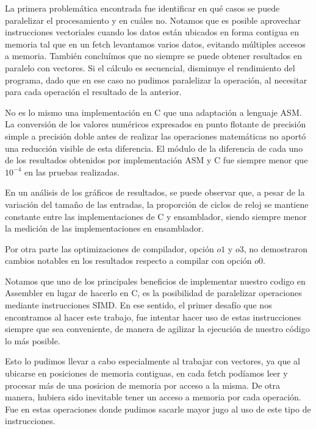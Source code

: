
\par La primera problemática encontrada fue identificar en qué casos se puede paralelizar el procesamiento y en cuáles no. Notamos que es posible aprovechar instrucciones vectoriales cuando los datos están ubicados en forma contigua en memoria tal que en un fetch levantamos varios datos, evitando múltiples accesos a memoria. También concluímos que no siempre se puede obtener resultados en paralelo con vectores. Si el cálculo es secuencial, disminuye el rendimiento del programa, dado que en ese caso no pudimos paralelizar la operación, al necesitar para cada operación el resultado de la anterior.

No es lo mismo una implementación en C que una adaptación a lenguaje ASM. La conversión de los valores numéricos expresados en punto flotante de precisión simple a precisión doble antes de realizar las operaciones matemáticas no aportó una reducción visible de esta diferencia. El módulo de la diferencia de cada uno de los resultados obtenidos por implementación ASM y C fue siempre menor que $10^{-4}$ en las pruebas realizadas.%


\par En un análisis de los gráficos de resultados, se puede observar que, a pesar de la variación del tamaño de las entradas, la proporción de ciclos de reloj se mantiene constante entre las implementaciones de C y ensamblador, siendo siempre menor la medición de las implementaciones en ensamblador.%

\par Por otra parte las optimizaciones de compilador, opción $o1$ y $o3$, no demostraron cambios notables en los resultados respecto a compilar con opción $o0$.

\par 
Notamos que uno de los principales beneficios de implementar nuestro codigo en Assembler en lugar de hacerlo en C, es la posibilidad de paralelizar operaciones mediante instrucciones SIMD.
En ese sentido, el primer desafío que nos encontramos al hacer este trabajo, fue intentar hacer uso de estas instrucciones siempre que sea conveniente, de manera de agilizar la ejecución de nuestro código lo más posible.

Esto lo pudimos llevar a cabo especialmente al trabajar con vectores, ya que al ubicarse en posiciones de memoria contiguas, en cada fetch podíamos leer y procesar más de una posicion de memoria por acceso a la misma. De otra manera, hubiera sido inevitable tener un acceso a memoria por cada operación. Fue en estas operaciones donde pudimos sacarle mayor jugo al uso de este tipo de instrucciones.

